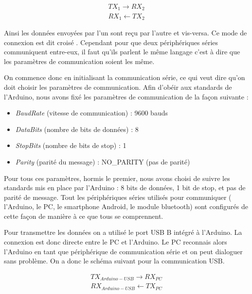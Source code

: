 \documentclass{polytech/polytech}
\begin{document}
\begin{eqnarray}
TX_1 \rightarrow RX_2
\\
RX_1 \leftarrow TX_2
\end{eqnarray}

Ainsi les données envoyées par l'un sont reçu par l'autre et vis-versa. Ce mode de connexion est dit \guillemotleft croisé \guillemotright .
Cependant pour que deux périphériques séries communiquent entre-eux, il faut qu'ils parlent le même langage c'est à dire que les paramètres de communication soient les même.

On commence donc en initialisant la communication série, ce qui veut dire qu'on doit choisir les paramètres de communication. Afin d'obéir aux standards de l'Arduino, nous avons fixé les paramètres de communication de la façon suivante :

\begin{itemize}
\item \textit{BaudRate} (vitesse de communication) : 9600 bauds
\item \textit{DataBits} (nombre de bits de données) : 8
\item \textit{StopBits} (nombre de bits de stop) : 1
\item \textit{Parity} (parité du message) : NO\_PARITY (pas de parité)
\end{itemize}

Pour tous ces paramètres, hormis le premier, nous avons choisi de suivre les standards mis en place par l'Arduino : 8 bits de données, 1 bit de stop, et pas de parité de message.
Tout les périphériques séries utilisés pour communiquer ( l'Arduino, le PC, le smartphone Android, le module bluetooth) sont configurés de cette façon de manière à ce que tous se comprennent.

Pour transmettre les données on a utilisé le port USB B intégré à l'Arduino. La connexion est donc directe entre le PC et l'Arduino. Le PC reconnais alors l'Arduino en tant que périphérique de communication série et on peut dialoguer sans problème. On a donc le schéma suivant pour la communication USB.

\begin{eqnarray}
TX_{Arduino-USB} \rightarrow RX_{PC}  \\
RX_{Arduino-USB}  \leftarrow TX_{PC}
\end{eqnarray}
\end{document}
